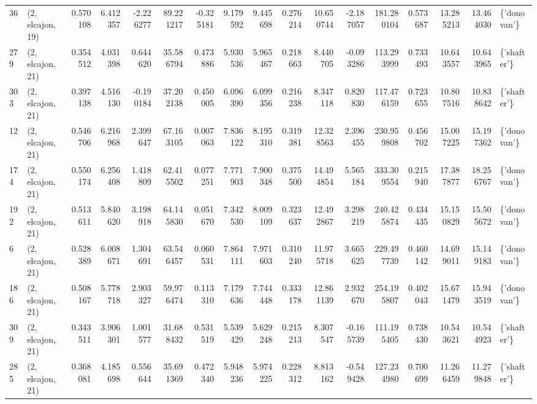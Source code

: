 \begin{tabular}{llrrrrrrrrrrrrrrl}
36  &  (2, elcajon, 19) &   0.570108 &   6.412357 &  -2.226277 &    89.221217 &  -0.325181 &   9.179592 &   9.445698 &  0.276214 &  10.650744 &  -2.187057 &   181.280104 &   0.573687 &  13.285213 &  13.464030 &  \{'donovan'\} \\
279 &  (2, elcajon, 21) &   0.354512 &   4.031398 &   0.644620 &    35.586794 &   0.473886 &   5.930536 &   5.965467 &  0.218663 &   8.440705 &  -0.093286 &   113.293999 &   0.733493 &  10.643557 &  10.643965 &  \{'shafter'\} \\
303 &  (2, elcajon, 21) &   0.397138 &   4.516130 &  -0.190184 &    37.202138 &   0.450005 &   6.096390 &   6.099356 &  0.216238 &   8.347118 &   0.820830 &   117.476159 &   0.723655 &  10.807516 &  10.838642 &  \{'shafter'\} \\
12  &  (2, elcajon, 21) &   0.546706 &   6.216968 &   2.399647 &    67.163105 &   0.007063 &   7.836122 &   8.195310 &  0.319381 &  12.328563 &   2.396455 &   230.959808 &   0.456702 &  15.007225 &  15.197362 &  \{'donovan'\} \\
174 &  (2, elcajon, 21) &   0.550174 &   6.256408 &   1.418809 &    62.415502 &   0.077251 &   7.771903 &   7.900348 &  0.375500 &  14.494854 &   5.565184 &   333.309554 &   0.215940 &  17.387877 &  18.256767 &  \{'donovan'\} \\
192 &  (2, elcajon, 21) &   0.513611 &   5.840620 &   3.198918 &    64.145830 &   0.051670 &   7.342530 &   8.009109 &  0.323637 &  12.492867 &   3.298219 &   240.425874 &   0.434435 &  15.150829 &  15.505672 &  \{'donovan'\} \\
6   &  (2, elcajon, 21) &   0.528389 &   6.008671 &   1.304691 &    63.546457 &   0.060531 &   7.864111 &   7.971603 &  0.310240 &  11.975718 &   3.665625 &   229.497739 &   0.460142 &  14.699011 &  15.149183 &  \{'donovan'\} \\
186 &  (2, elcajon, 21) &   0.508167 &   5.778718 &   2.903327 &    59.976474 &   0.113310 &   7.179636 &   7.744448 &  0.333178 &  12.861139 &   2.932670 &   254.195807 &   0.402043 &  15.671479 &  15.943519 &  \{'donovan'\} \\
309 &  (2, elcajon, 21) &   0.343511 &   3.906301 &   1.001577 &    31.688432 &   0.531519 &   5.539429 &   5.629248 &  0.215213 &   8.307547 &  -0.165739 &   111.195405 &   0.738430 &  10.543621 &  10.544923 &  \{'shafter'\} \\
285 &  (2, elcajon, 21) &   0.368081 &   4.185698 &   0.556644 &    35.691369 &   0.472340 &   5.948236 &   5.974225 &  0.228312 &   8.813162 &  -0.549428 &   127.234980 &   0.700699 &  11.266459 &  11.279848 &  \{'shafter'\} \\

\end{tabular}
